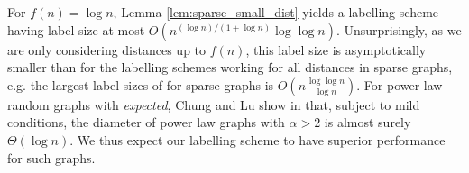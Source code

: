For $f(n) = \log n$, Lemma \ref{lem:sparse_small_dist} yields a labelling scheme having label size
at most $O\left(n^{(\log n)/(1+ \log n)} \log\log n \right)$. Unsurprisingly, as we are only considering distances up
to $f(n)$, this label size is asymptotically smaller than for the labelling
schemes working for all distances in sparse graphs, e.g. the largest label sizes of \cite{DBLP:journals/corr/GawrychowskiKU15} for sparse graphs is $O(n \frac{\log \log n}{ \log n})$.
For power law random graphs with \emph{expected}, Chung and Lu show in \cite{chung2004average} that, subject to mild conditions, the diameter of power law graphs with $\alpha > 2$ is almost surely $\Theta(\log n)$. We thus expect our labelling scheme to have
superior performance for such graphs.
